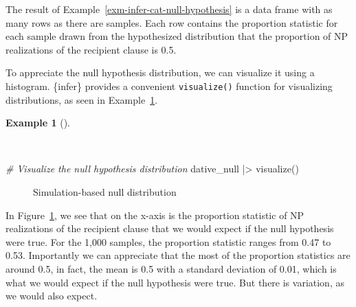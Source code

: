 \documentclass[
  letterpaper,
]{book}
\newenvironment{Shaded}{\begin{snugshade}}{\end{snugshade}}
\newcommand{\CommentTok}[1]{\textcolor[rgb]{0.00,0.00,0.00}{\textit{#1}}}
\newcommand{\FunctionTok}[1]{\textcolor[rgb]{0.00,0.00,0.00}{#1}}
\newcommand{\NormalTok}[1]{\textcolor[rgb]{0.00,0.00,0.00}{#1}}
\newcommand{\SpecialCharTok}[1]{\textcolor[rgb]{0.00,0.00,0.00}{#1}}
\theoremstyle{definition}
\newtheorem{example}{Example}[chapter]
\theoremstyle{remark}
\begin{document}
The result of Example~\ref{exm-infer-cat-null-hypothesis} is a data
frame with as many rows as there are samples. Each row contains the
proportion statistic for each sample drawn from the hypothesized
distribution that the proportion of NP realizations of the recipient
clause is 0.5.

To appreciate the null hypothesis distribution, we can visualize it
using a histogram. \{infer\} provides a convenient \texttt{visualize()}
function for visualizing distributions, as seen in
Example~\ref{exm-infer-cat-null-hypothesis-vis}.

\begin{example}[]\protect\hypertarget{exm-infer-cat-null-hypothesis-vis}{}\label{exm-infer-cat-null-hypothesis-vis}

~

\begin{Shaded}
\begin{Highlighting}[]
\CommentTok{\# Visualize the null hypothesis distribution}
\NormalTok{dative\_null }\SpecialCharTok{|\textgreater{}} \FunctionTok{visualize}\NormalTok{()}
\end{Highlighting}
\end{Shaded}

\begin{figure}[!htb]


\caption{\label{fig-infer-cat-null-hypothesis}Simulation-based null
distribution}

\end{figure}%

\end{example}

In Figure~\ref{fig-infer-cat-null-hypothesis}, we see that on the x-axis
is the proportion statistic of NP realizations of the recipient clause
that we would expect if the null hypothesis were true. For the 1,000
samples, the proportion statistic ranges from 0.47 to 0.53. Importantly
we can appreciate that the most of the proportion statistics are around
0.5, in fact, the mean is 0.5 with a standard deviation of 0.01, which
is what we would expect if the null hypothesis were true. But there is
variation, as we would also expect.
\end{document}
